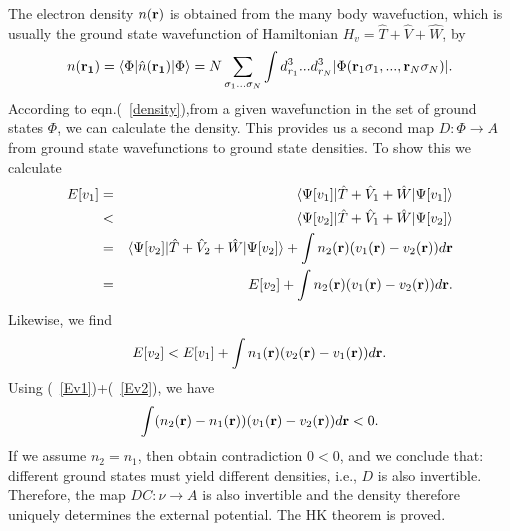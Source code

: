 The electron density $n({\bf r})$ is obtained from the many body wavefuction, which is usually the ground state wavefunction of Hamiltonian $H_v={\hat T}+\hat V+ \hat W$, by
\begin{equation}
 n({\bf r_1})=\langle\Phi |\hat n({\bf r_1})|\Phi\rangle = N\sum_{\sigma_1...\sigma_N}\int d^3_{r_1}...d^3_{r_N}|\Phi({\bf r}_1\sigma_1,...,{\bf r}_N\sigma_N)|.
\label{density}
\end{equation}
According to eqn.(~\ref{density}),from a given wavefunction in the set of ground states $\Phi$,  we can calculate the density.
This provides us a second map $D:\Phi \rightarrow A$ from ground state wavefunctions to ground state densities. To show this we calculate 
\begin{eqnarray}
E[v_1] &=& \langle\Psi[v_1]|\hat T + \hat V_1 +\hat W|\Psi[v_1]\rangle \nonumber\\  
           &<& \langle\Psi[v_2]|\hat T + \hat V_1 +\hat W|\Psi[v_2]\rangle \nonumber \\
           &=&  \langle\Psi[v_2]|\hat T + \hat V_2 +\hat W|\Psi[v_2]\rangle +\int n_2({\bf r})(v_1({\bf r})-v_2({\bf r}))d{\bf r} \nonumber\\
           &=&  E[v_2] +\int n_2({\bf r})(v_1({\bf r})-v_2({\bf r}))d{\bf r} \label{Ev1}.
\end{eqnarray}
Likewise, we find
\begin{equation}
E[v_2]<  E[v_1] +\int n_1({\bf r})(v_2({\bf r})-v_1({\bf r}))d{\bf r} \label{Ev2}.
\end{equation}
 Using (~\ref{Ev1})+(~\ref{Ev2}), we have
 \begin{equation}
  \int (n_2({\bf r})-n_1({\bf r}))(v_1({\bf r})-v_2({\bf r}))d{\bf r} < 0.
 \end{equation}
If we assume $n_2=n_1$, then obtain contradiction $0<0$, and we conclude that: different ground states must yield
different densities, i.e., $D$ is also invertible. Therefore, the map $DC: \nu \rightarrow A$ is also invertible and the density therefore uniquely determines the external potential. The HK theorem is proved.


